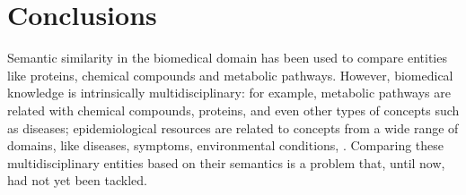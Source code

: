 \chapter{Conclusions} \label{chap:conclusions}


Semantic similarity in the biomedical domain has been used to compare entities like proteins, chemical compounds and metabolic pathways. However, biomedical knowledge is intrinsically multidisciplinary: for example, metabolic pathways are related with chemical compounds, proteins, and even other types of concepts such as diseases; epidemiological resources are related to concepts from a wide range of domains, like diseases, symptoms, environmental conditions, \etc. Comparing these multidisciplinary entities based on their semantics is a problem that, until now, had not yet been tackled.


